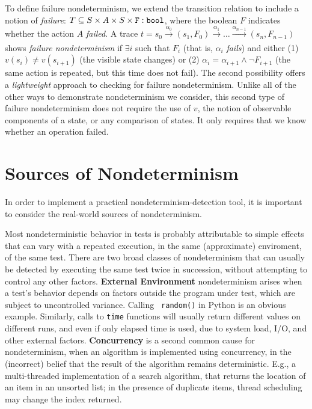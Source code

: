 To define failure nondeterminism, we extend the
transition relation to include a notion of \emph{failure}: $T \subseteq S
\times A \times S \times {\tt F: bool}$, where the boolean $F$ indicates
whether the action $A$ \emph{failed}.   A trace $t = s_0
\xrightarrow[]{\alpha_0} (s_1, F_0) \xrightarrow[]{\alpha_1} \ldots
\xrightarrow[]{\alpha_{n-1}} (s_n, F_{n-1})$ shows \emph{failure
  nondeterminism} if $\exists i$ such that $F_{i}$ (that is,
$\alpha_i$ \emph{fails}) and either (1) $v(s_{i}) \neq v(s_{i+1})$
(the visible state changes) or (2)
$\alpha_i = \alpha_{i+1} \wedge \neg F_{i+1}$ (the same action is
repeated, but this time does not fail).  The second possibility
offers a \emph{lightweight} approach to checking for failure
nondeterminism.  Unlike all of the other ways to demonstrate
nondeterminism we consider, this second type of failure nondeterminism does not
require the use of $v$, the notion of observable components of
a state, or any comparison of states.  It only
requires that we know whether an operation failed.

\section{Sources of Nondeterminism}
\label{sec:sources}

In order to implement a practical nondeterminism-detection tool, it is
important to consider the real-world sources of nondeterminism.  

Most nondeterministic behavior in tests is probably attributable to simple
effects that can vary with a repeated execution, in the same
(approximate) enviroment, of the same test.  There are two broad classes of
nondeterminism that can usually be detected by
executing the same test twice in succession, without attempting
to control any other factors.  {\bf External Environment} nondeterminism arises
  when a test's behavior depends on factors outside the program under
  test, which are subject to uncontrolled variance.  Calling {\tt
    random()} in Python is an obvious example. Similarly, calls to {\tt time}
  functions  will usually return different values on different runs,
  and even if only elapsed time is used, due to system load, I/O, and
  other external factors.  {\bf Concurrency} is a second common cause for
  nondeterminism, when an algorithm is implemented using
  concurrency, in the (incorrect) belief that the result of the
  algorithm remains deterministic.  E.g., a multi-threaded
  implementation of a search algorithm, that returns the location of
  an item in an unsorted list; in the presence of duplicate items, thread scheduling may change the index returned.

